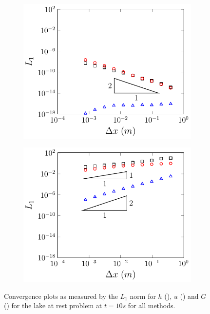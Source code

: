 \begin{figure}
\begin{subfigure}{0.5\textwidth}
	\end{subfigure}
	\begin{subfigure}{0.5\textwidth}
		\includegraphics[width=\textwidth]{./chp5/figures/Analytic/LakeAtRest/L1/FDVMWB.pdf}
		\vspace{0.5cm}
	\end{subfigure}%
	\begin{subfigure}{0.5\textwidth}
		\includegraphics[width=\textwidth]{./chp5/figures/Analytic/LakeAtRest/L1/FDVMnWB.pdf}
		\vspace{0.5cm}
	\end{subfigure}
	\caption{Convergence plots as measured by the $L_1$ norm for $h$ (), $u$ () and $G$ () for the lake at rest problem at $t=10s$ for all methods.}
	\label{fig:LakeAtRestEL1}
\end{figure}

